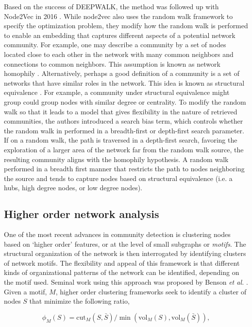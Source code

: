 \indent Based on the success of DEEPWALK, the method was followed up with Node2Vec in 2016 \cite{node2vec}. While node2vec also uses the random walk framework to specify the optimization problem, they modify how the random walk is performed to enable an embedding that captures different aspects of a potential network community. For example, one may describe a community by a set of nodes located close to each other in the network with many common neighbors and connections to common neighbors. This assumption is known as network homophily \cite{homophily}. Alternatively, perhaps a good definition of a community is a set of networks that have similar roles in the network. This idea is known as structural equivalence \cite{structural}. For example, a community under structural equivalence might group could group nodes with similar degree or centrality. To modify the random walk so that it leads to a model that gives flexibility in the nature of retrieved communities, the authors introduced a search bias term, which controls whether the random walk in performed in a breadth-first or depth-first search parameter. If on a random walk, the path is traversed in a depth-first search, favoring the exploration of a larger area of the network far from the random walk source, the resulting community aligns with the homophily hypothesis. A random walk performed in a breadth first manner that restricts the path to nodes neighboring the source and tends to capture nodes based on structural equivalence (i.e. a hubs, high degree nodes, or low degree nodes). 

\subsection{Higher order network analysis}
One of the most recent advances in community detection is clustering nodes based on `higher order' features, or at the level of small subgraphs or \emph{motifs}. The structural organization of the network is then interrogated by identifying clusters of network motifs. The flexibility and appeal of this framework is that different kinds of organizational patterns of the network can be identified, depending on the motif used. Seminal work using this approach was proposed by Benson \emph{et al.} \cite{Benson} . Given a motif, $M$, higher order clustering frameworks seek to identify a cluster of nodes $S$ that minimize the following ratio,

\begin{equation}
\phi_{M}(S)=\text{cut}_{M}(S,\bar{S})/\min(\text{vol}_{M}(S),\text{vol}_{M}(\bar{S})),
\end{equation}

